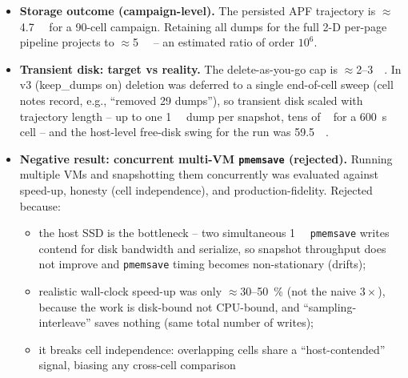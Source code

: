 \documentclass[conference]{IEEEtran}
\begin{document}
\begin{itemize}
        large fraction of expected pairs).
  \item \textbf{Storage outcome (campaign-level).} The persisted APF trajectory
        is $\approx$\SI{4.7}{\mebi\byte} for a 90-cell campaign. Retaining all
        dumps for the full 2-D per-page pipeline projects to
        $\approx$\SI{5}{\tebi\byte} -- an estimated ratio of order $10^{6}$.
  \item \textbf{Transient disk: target vs reality.} The delete-as-you-go cap is
        $\approx$\SI{2}{}--\SI{3}{\gibi\byte}. In v3 (keep\_dumps on) deletion
        was deferred to a single end-of-cell sweep (cell notes record, e.g.,
        ``removed 29 dumps''), so transient disk scaled with trajectory length
        -- up to one \SI{1}{\gibi\byte} dump per snapshot, tens of \si{\gibi\byte}
        for a \SI{600}{\second} cell -- and the host-level free-disk swing for
        the run was \SI{59.5}{\gibi\byte}.
  \item \textbf{Negative result: concurrent multi-VM \texttt{pmemsave} (rejected).}
        Running multiple VMs and snapshotting them concurrently was evaluated
        against speed-up, honesty (cell independence), and production-fidelity.
        Rejected because:
    \begin{itemize}
      \item the host SSD is the bottleneck -- two simultaneous
            \SI{1}{\gibi\byte} \texttt{pmemsave} writes contend for disk
            bandwidth and serialize, so snapshot throughput does not improve and
            \texttt{pmemsave} timing becomes non-stationary (drifts);
      \item realistic wall-clock speed-up was only $\approx$\SI{30}{}--\SI{50}{\percent}
            (not the naive $3\times$), because the work is disk-bound not
            CPU-bound, and ``sampling-interleave'' saves nothing (same total
            number of writes);
      \item it breaks cell independence: overlapping cells share a
            ``host-contended'' signal, biasing any cross-cell comparison

\end{itemize}
\end{itemize}
\end{document}
